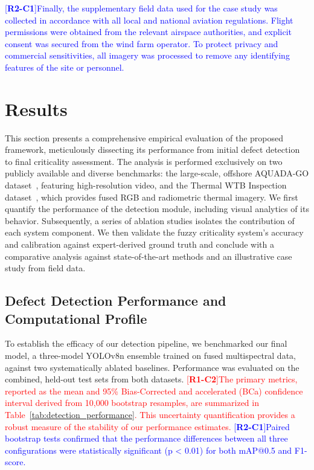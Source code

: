 \documentclass[energies,article,submit,pdftex,moreauthors]{Definitions/mdpi}
\newcommand{\revtag}[2]{[\textbf{R#1-C#2}]}
\newcommand{\Rone}[1]{\textcolor{red}{#1}}
\newcommand{\Rtwo}[1]{\textcolor{blue}{#1}}
\begin{document}
\Rtwo{\revtag{2}{1}Finally, the supplementary field data used for the case study was collected in accordance with all local and national aviation regulations. Flight permissions were obtained from the relevant airspace authorities, and explicit consent was secured from the wind farm operator. To protect privacy and commercial sensitivities, all imagery was processed to remove any identifying features of the site or personnel.}


\section{Results}\label{sec:results}
This section presents a comprehensive empirical evaluation of the proposed framework, meticulously dissecting its performance from initial defect detection to final criticality assessment. The analysis is performed exclusively on two publicly available and diverse benchmarks: the large-scale, offshore AQUADA-GO dataset~\cite{Chen2024Dataset}, featuring high-resolution video, and the Thermal WTB Inspection dataset~\cite{Memari2024Data}, which provides fused RGB and radiometric thermal imagery. We first quantify the performance of the detection module, including visual analytics of its behavior. Subsequently, a series of ablation studies isolates the contribution of each system component. We then validate the fuzzy criticality system's accuracy and calibration against expert-derived ground truth and conclude with a comparative analysis against state-of-the-art methods and an illustrative case study from field data.

\subsection{Defect Detection Performance and Computational Profile}
To establish the efficacy of our detection pipeline, we benchmarked our final model, a three-model YOLOv8n ensemble trained on fused multispectral data, against two systematically ablated baselines. Performance was evaluated on the combined, held-out test sets from both datasets. \Rone{\revtag{1}{2}The primary metrics, reported as the mean and 95\% Bias-Corrected and accelerated (BCa) confidence interval derived from 10,000 bootstrap resamples, are summarized in Table~\ref{tab:detection_performance}. This uncertainty quantification provides a robust measure of the stability of our performance estimates.} \Rtwo{\revtag{2}{1}Paired bootstrap tests confirmed that the performance differences between all three configurations were statistically significant (p < 0.01) for both mAP@0.5 and F1-score.}
\end{document}

